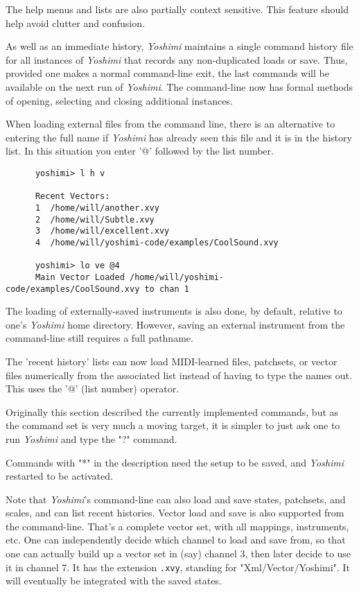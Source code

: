    The help menus and lists are also partially context sensitive. This
   feature should help avoid clutter and confusion.

   As well as an immediate history, \textsl{Yoshimi} maintains a single command
   history file for all instances of \textsl{Yoshimi} that records any
   non-duplicated loads or save.  Thus, provided one makes a normal
   command-line exit, the last commands will be available on the next run of
   \textsl{Yoshimi}.
   The command-line now has formal methods of opening, selecting and closing
   additional instances.

   When loading external files from the command line, there is an alternative
   to entering the full name if \textsl{Yoshimi} has already seen this file and
   it is in the history list. In this situation you enter '@' followed by the
   list number.

   \begin{verbatim}
      yoshimi> l h v
       
      Recent Vectors:
      1  /home/will/another.xvy
      2  /home/will/Subtle.xvy
      3  /home/will/excellent.xvy
      4  /home/will/yoshimi-code/examples/CoolSound.xvy

      yoshimi> lo ve @4
      Main Vector Loaded /home/will/yoshimi-code/examples/CoolSound.xvy to chan 1
   \end{verbatim}

   The loading of externally-saved instruments is also done, by default,
   relative to one's \textsl{Yoshimi} home directory.  However, saving an
   external instrument from the command-line still requires a full pathname.

   The 'recent history' lists can now load MIDI-learned files, patchsets, or
   vector files numerically from the associated list instead of having to type
   the names out.  This uses the '@' (list number) operator.

   Originally this section described the currently implemented commands,
   but as the command set is very much a moving target, it is simpler to just
   ask one to run \textsl{Yoshimi} and type the "?" command.

   Commands with "*" in the description need the setup to be saved,
   and \textsl{Yoshimi} restarted to be activated. 

   Note that \textsl{Yoshimi}'s command-line can also load and save states,
   patchsets, and scales, and can list recent histories.
   Vector load and save is also supported from the command-line.
   That's a complete vector set, with all mappings, instruments, etc.
   One can independently decide which
   channel to load and save from, so that one
   can actually build up a vector set in
   (say) channel 3, then later decide to use it in channel 7.
   It has the extension \texttt{.xvy}, standing for "Xml/Vector/Yoshimi".
   It will eventually be integrated with the saved states.

